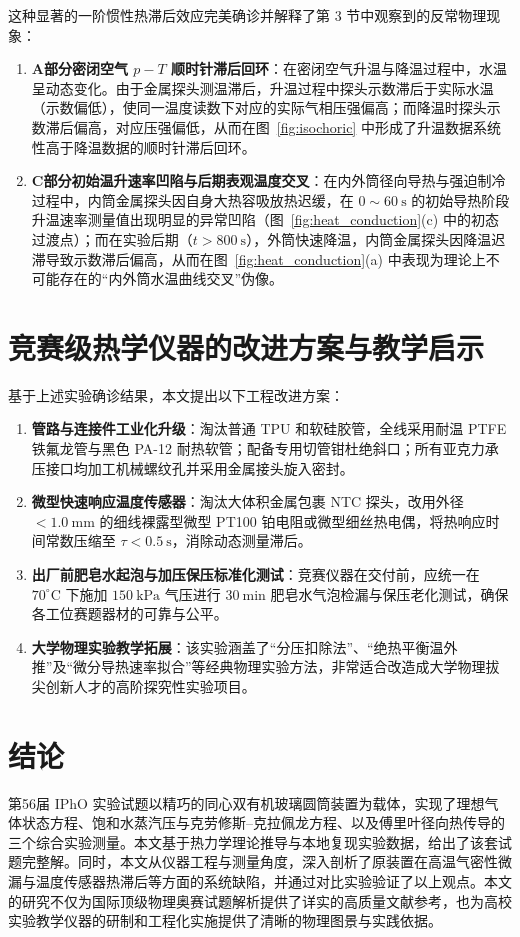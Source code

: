 \documentclass[10pt, a4paper]{ctexart}
\begin{document}
这种显著的一阶惯性热滞后效应完美确诊并解释了第 3 节中观察到的反常物理现象：
\begin{enumerate}
\item \textbf{A部分密闭空气 $p-T$ 顺时针滞后回环}：在密闭空气升温与降温过程中，水温呈动态变化。由于金属探头测温滞后，升温过程中探头示数滞后于实际水温（示数偏低），使同一温度读数下对应的实际气相压强偏高；而降温时探头示数滞后偏高，对应压强偏低，从而在图~\ref{fig:isochoric} 中形成了升温数据系统性高于降温数据的顺时针滞后回环。
\item \textbf{C部分初始温升速率凹陷与后期表观温度交叉}：在内外筒径向导热与强迫制冷过程中，内筒金属探头因自身大热容吸放热迟缓，在 $0\sim 60\ \mathrm{s}$ 的初始导热阶段升温速率测量值出现明显的异常凹陷（图~\ref{fig:heat_conduction}(c) 中的初态过渡点）；而在实验后期（$t > 800\ \mathrm{s}$），外筒快速降温，内筒金属探头因降温迟滞导致示数滞后偏高，从而在图~\ref{fig:heat_conduction}(a) 中表现为理论上不可能存在的“内外筒水温曲线交叉”伪像。
\end{enumerate}

\section{竞赛级热学仪器的改进方案与教学启示}
基于上述实验确诊结果，本文提出以下工程改进方案：
\begin{enumerate}
\item \textbf{管路与连接件工业化升级}：淘汰普通 TPU 和软硅胶管，全线采用耐温 PTFE 铁氟龙管与黑色 PA-12 耐热软管；配备专用切管钳杜绝斜口；所有亚克力承压接口均加工机械螺纹孔并采用金属接头旋入密封。
\item \textbf{微型快速响应温度传感器}：淘汰大体积金属包裹 NTC 探头，改用外径 $< 1.0\ \mathrm{mm}$ 的细线裸露型微型 PT100 铂电阻或微型细丝热电偶，将热响应时间常数压缩至 $\tau < 0.5\ \mathrm{s}$，消除动态测量滞后。
\item \textbf{出厂前肥皂水起泡与加压保压标准化测试}：竞赛仪器在交付前，应统一在 $70^\circ\mathrm{C}$ 下施加 $150\ \mathrm{kPa}$ 气压进行 $30\ \mathrm{min}$ 肥皂水气泡检漏与保压老化测试，确保各工位赛题器材的可靠与公平。
\item \textbf{大学物理实验教学拓展}：该实验涵盖了“分压扣除法”、“绝热平衡温外推”及“微分导热速率拟合”等经典物理实验方法，非常适合改造成大学物理拔尖创新人才的高阶探究性实验项目\cite{ref5, ref8}。
\end{enumerate}

\section{结论}
第56届 IPhO 实验试题以精巧的同心双有机玻璃圆筒装置为载体，实现了理想气体状态方程、饱和水蒸汽压与克劳修斯--克拉佩龙方程、以及傅里叶径向热传导的三个综合实验测量。本文基于热力学理论推导与本地复现实验数据，给出了该套试题完整解。同时，本文从仪器工程与测量角度，深入剖析了原装置在高温气密性微漏与温度传感器热滞后等方面的系统缺陷，并通过对比实验验证了以上观点。本文的研究不仅为国际顶级物理奥赛试题解析提供了详实的高质量文献参考，也为高校实验教学仪器的研制和工程化实施提供了清晰的物理图景与实践依据。
\end{document}
